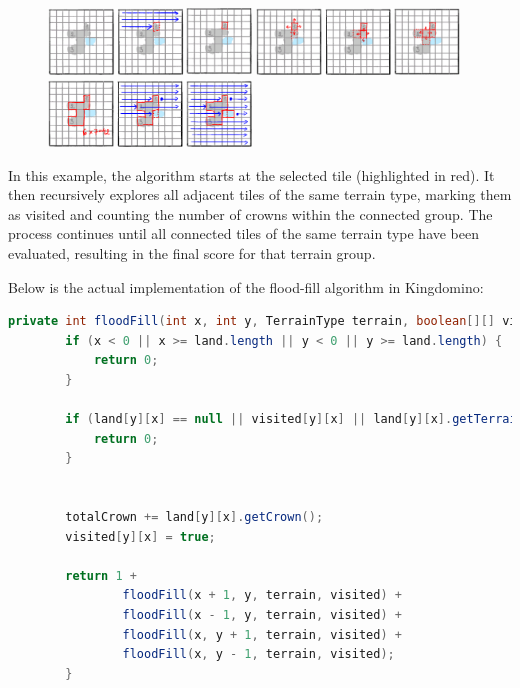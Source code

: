 \documentclass[conference]{IEEEtran}
\begin{document}
\begin{figure}[htbp]
    \centerline{\includegraphics[width=0.48\textwidth]{assets/floodfill-start.png}}
    \centerline{\includegraphics[width=0.48\textwidth]{assets/floodfill-detected.png}}
    \centerline{\includegraphics[width=0.48\textwidth]{assets/floodfill-continue.png}}
\end{figure}

In this example, the algorithm starts at the selected tile (highlighted in
red). It then recursively explores all adjacent tiles of the same terrain type,
marking them as visited and counting the number of crowns within the connected
group. The process continues until all connected tiles of the same terrain type
have been evaluated, resulting in the final score for that terrain group.

Below is the actual implementation of the flood-fill algorithm in Kingdomino:

\begin{lstlisting}[language=Java, caption={Flood-Fill Algorithm}, label={lst:floodfill}]
    private int floodFill(int x, int y, TerrainType terrain, boolean[][] visited) {
        if (x < 0 || x >= land.length || y < 0 || y >= land.length) {
            return 0;
        }
    
        if (land[y][x] == null || visited[y][x] || land[y][x].getTerrain() != terrain) {
            return 0;
        }
        
    
        totalCrown += land[y][x].getCrown();
        visited[y][x] = true;
    
        return 1 +
                floodFill(x + 1, y, terrain, visited) +
                floodFill(x - 1, y, terrain, visited) +
                floodFill(x, y + 1, terrain, visited) +
                floodFill(x, y - 1, terrain, visited);
        }
    \end{lstlisting}
\end{document}
